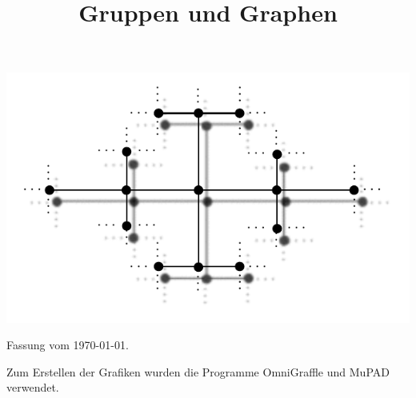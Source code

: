 \documentclass[a4paper, 12pt, twoside]{article}
\title{\Huge \textbf{
\textsf{Gruppen und Graphen}}}
\date{}
\begin{document}
\maketitle
\begin{center}
	\includegraphics{grugraImages/titel}
\end{center}

\newpage

\renewcommand{\thepage}{\roman{page}} 

\newpage \thispagestyle{empty}
{\footnotesize
{}
Fassung vom \today.

Zum Erstellen der Grafiken wurden die Programme {\sf OmniGraffle} und
{\sf MuPAD} verwendet.
}
\cleardoublepage

\tableofcontents
\cleardoublepage

\setcounter{page}{1} %
\renewcommand{\thepage}{\arabic{page}} 

\cleardoublepage


\cleardoublepage


\cleardoublepage


\cleardoublepage


\cleardoublepage


\end{document}

